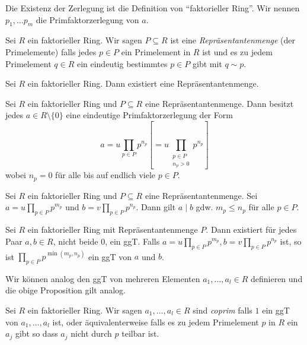 	Die Existenz der Zerlegung ist die Definition von \enquote{faktorieller Ring}.
	Wir nennen $p_1,\ldots p_{m}$ die Primfaktorzerlegung von $a$.


\begin{definition}
	Sei $R$ ein faktorieller Ring.
	Wir sagen $P \subseteq R$ ist eine \emph{Repräsentantenmenge} (der Primelemente) falls jedes $p \in P$ ein Primelement in $R$ ist
	und es zu jedem Primelement $q \in R$ ein eindeutig bestimmtes $p \in P$ gibt mit $q \sim p$.
\end{definition}


\begin{lemma}
	Sei $R$ ein faktorieller Ring.
	Dann existiert eine Repräsentantenmenge.
\end{lemma}


\begin{theorem}
	Sei $R$ ein faktorieller Ring und $P \subseteq R$ eine Repräsentantenmenge.
	Dann besitzt jedes $a \in R \setminus \{0\}$ eine eindeutige Primfaktorzerlegung
	der Form 
	\[
		a = u \prod_{p \in P} p^{n_p} \left[ = u \prod_{\substack{p \in P\\ n_{p} > 0}} p^{n_{p}}  \right]
	\] 
	wobei $n_{p} = 0$ für alle bis auf endlich viele $p \in P$.
\end{theorem}



\begin{lemma}
	Sei $R$ ein faktorieller Ring und $P \subseteq R$ eine Repräsentantenmenge.
	Sei $a = u \prod_{p \in P} p^{m_{p}}$ und $b = v \prod_{p \in P} p^{n_{p}}$.
	Dann gilt $a \mid b$ gdw. $m_{p} \leq n_{p}$ für alle $p \in P$.
\end{lemma}


\begin{proposition}[ggT]
	Sei $R$ ein faktorieller Ring mit Repräsentantenmenge $P$.
	Dann existiert für jedes Paar $a,b \in R$, nicht beide $0$,
	ein ggT. Falls $a = u \prod_{p \in P} p^{m_{p}}, b = v \prod_{p \in P} p^{n_{p}}$ ist, so ist
	$\prod_{p \in P} p^{\min(m_{p},n_{p})}$ ein ggT von $a$ und $b$.
\end{proposition}


Wir können analog den ggT von mehreren Elementen $a_1,\ldots, a_{l} \in R$ definieren und die obige Proposition gilt analog.

\begin{definition}
	Sei $R$ ein faktorieller Ring. Wir sagen $a_1,\ldots,a_{l} \in R$ sind \emph{coprim} falls $1$ ein ggT von
	$a_1,\ldots,a_{l}$ ist, oder äquivalenterweise falls es zu jedem Primelement $p$ in $R$ 
	ein $a_{j}$ gibt so dass $a_{j}$ nicht durch $p$ teilbar ist.
\end{definition}

